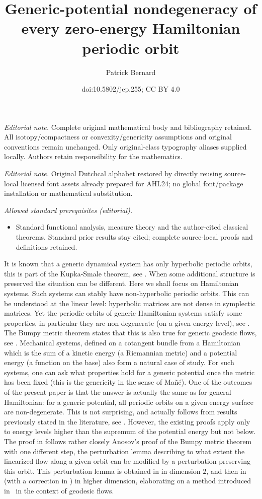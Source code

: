 \documentclass[10pt]{amsart}
\title{Generic-potential nondegeneracy of every zero-energy Hamiltonian periodic orbit}
\author{Patrick Bernard}
\date{doi:10.5802/jep.255; CC BY 4.0}
\theoremstyle{plain}
\theoremstyle{definition}
\providecommand{\mainmatter}{}\providecommand{\backmatter}{}
\begin{document}
\maketitle
\noindent\textit{Editorial note.} Complete original mathematical body and bibliography retained. All isotopy/compactness or convexity/genericity assumptions and original conventions remain unchanged. Only original-class typography aliases supplied locally. Authors retain responsibility for the mathematics.\par\medskip
\noindent\textit{Editorial note.} Original Dutchcal alphabet restored by directly reusing source-local licensed font assets already prepared for AHL24; no global font/package installation or mathematical substitution.\par\medskip
\noindent\textit{Allowed standard prerequisites (editorial).}\begin{itemize}
\item Standard functional analysis, measure theory and the author-cited classical theorems. Standard prior results stay cited; complete source-local proofs and definitions retained.
\end{itemize}\medskip

\tableofcontents
\mainmatter

It is known that a generic dynamical system has only hyperbolic periodic orbits, this is part of the Kupka-Smale theorem, see
\cite{K63,S63}. When some additional structure is preserved the situation can be different. Here we shall focus on Hamiltonian systems.
Such systems can stably have non-hyperbolic periodic orbits.
This can be understood at the linear level: hyperbolic matrices are not dense in symplectic matrices.
Yet the periodic orbits of generic Hamiltonian systems satisfy some properties, in particular they are non degenerate (on a given energy level), see \cite{CR1,CR2}. The Bumpy metric theorem states that this is also true for generic geodesic flows, see \cite{A68,A82}.
Mechanical systems, defined on a cotangent bundle from a Hamiltonian
which is the sum of a kinetic energy (a Riemannian metric) and a potential energy (a function on the base)
also form a natural case of study.
For such systems, one can ask what properties hold for a generic potential once the metric has been fixed
(this is the genericity in the sense of Mañé).
One of the outcomes of the present paper is that the answer is actually the same as for general Hamiltonian: for a generic potential, all periodic orbits on a given energy surface are non-degenerate.
This is not surprising, and actually follows from results previously stated in the literature, see \cite{O08,RR}.
However, the existing proofs apply only to energy levels higher than the supremum of the potential energy but not below.
The proof in \cite{O08} follows rather closely Anosov's proof of the Bumpy metric theorem
with one different step, the perturbation lemma describing to what extent the linearized flow along a given orbit can be modified by a perturbation preserving this orbit. This perturbation lemma is obtained in \cite{O08} in dimension $2$, and then in \cite{RR}
(with a correction in \cite{AB}) in higher dimension, elaborating on
a method introduced in~\cite{Co10} in the context of geodesic flows.
\end{document}
